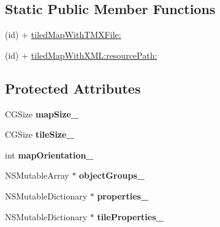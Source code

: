 \subsection*{Static Public Member Functions}
\begin{DoxyCompactItemize}
\item 
(id) + \hyperlink{interface_c_c_t_m_x_tiled_map_a57db15810898f2df6344d55fce22a22e}{tiled\-Map\-With\-T\-M\-X\-File\-:}
\item 
(id) + \hyperlink{interface_c_c_t_m_x_tiled_map_ad5077a832e06e09f627f1673cf53951f}{tiled\-Map\-With\-X\-M\-L\-:resource\-Path\-:}
\end{DoxyCompactItemize}
\subsection*{Protected Attributes}
\begin{DoxyCompactItemize}
\item 
\hypertarget{interface_c_c_t_m_x_tiled_map_a1bba912f1c89d11ccd13d4ca97f8b07d}{C\-G\-Size {\bfseries map\-Size\-\_\-}}\label{interface_c_c_t_m_x_tiled_map_a1bba912f1c89d11ccd13d4ca97f8b07d}

\item 
\hypertarget{interface_c_c_t_m_x_tiled_map_a8fcb106cbfb87bc5fd894114055d6416}{C\-G\-Size {\bfseries tile\-Size\-\_\-}}\label{interface_c_c_t_m_x_tiled_map_a8fcb106cbfb87bc5fd894114055d6416}

\item 
\hypertarget{interface_c_c_t_m_x_tiled_map_a79688614b775fdb2c00358de47de97d0}{int {\bfseries map\-Orientation\-\_\-}}\label{interface_c_c_t_m_x_tiled_map_a79688614b775fdb2c00358de47de97d0}

\item 
\hypertarget{interface_c_c_t_m_x_tiled_map_ad699dc2d3530dd0314e11a5ea62083a3}{N\-S\-Mutable\-Array $\ast$ {\bfseries object\-Groups\-\_\-}}\label{interface_c_c_t_m_x_tiled_map_ad699dc2d3530dd0314e11a5ea62083a3}

\item 
\hypertarget{interface_c_c_t_m_x_tiled_map_a03cb43d0f7518ebb91998cc2edc7116c}{N\-S\-Mutable\-Dictionary $\ast$ {\bfseries properties\-\_\-}}\label{interface_c_c_t_m_x_tiled_map_a03cb43d0f7518ebb91998cc2edc7116c}

\item 
\hypertarget{interface_c_c_t_m_x_tiled_map_ac8c7dcc3b632c20a4c3cc6535497a978}{N\-S\-Mutable\-Dictionary $\ast$ {\bfseries tile\-Properties\-\_\-}}\label{interface_c_c_t_m_x_tiled_map_ac8c7dcc3b632c20a4c3cc6535497a978}

\end{DoxyCompactItemize}
